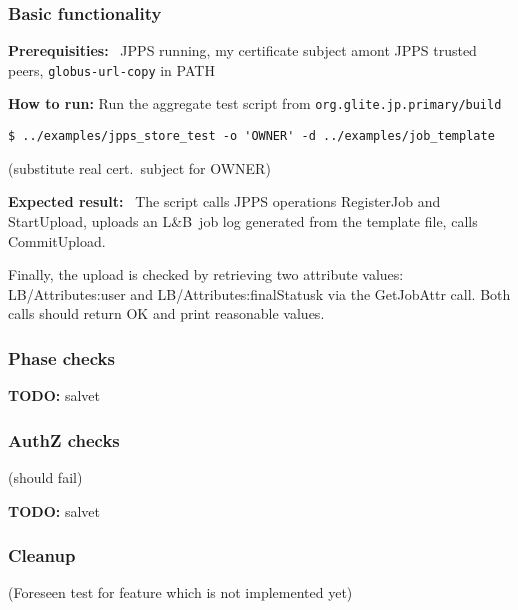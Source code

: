 \documentclass{egee}
\def\LB{L\&B}
\def\req{\noindent\textbf{Prerequisities: }}
\def\how{\noindent\textbf{How to run: }}
\def\result{\noindent\textbf{Expected result: }}
\def\todo#1{\textbf{TODO:} #1}
\begin{document}
\subsubsection{Basic functionality}
\req\ JPPS running, my certificate subject amont JPPS trusted peers, 
\verb'globus-url-copy' in PATH

\how
Run the aggregate test script from \verb'org.glite.jp.primary/build'

\begin{verbatim}
$ ../examples/jpps_store_test -o 'OWNER' -d ../examples/job_template
\end{verbatim}
(substitute real cert.\ subject for OWNER)

\result\ 
The script calls JPPS operations RegisterJob and StartUpload, 
uploads an \LB\ job log generated from the template file,
calls CommitUpload.

Finally, the upload is checked by retrieving two attribute
values: LB/Attributes:user and LB/Attributes:finalStatusk via the GetJobAttr
call. 
Both calls should return OK and print reasonable values.


\subsubsection{Phase checks}
\todo{salvet}

\subsubsection{AuthZ checks}
(should fail)

\todo{salvet}
%
%
%


\subsubsection{Cleanup}
(Foreseen test for feature which is not implemented yet)
\end{document}
